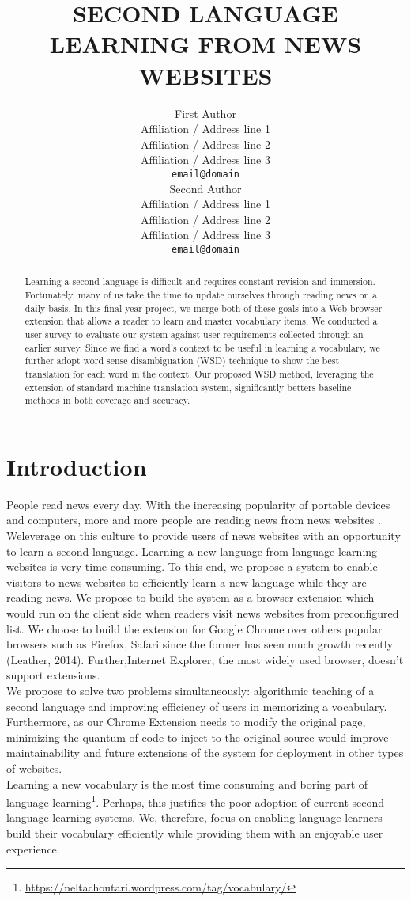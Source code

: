 \documentclass[11pt]{article}
\title{SECOND LANGUAGE LEARNING FROM NEWS WEBSITES}
\author{First Author \\
  Affiliation / Address line 1 \\
  Affiliation / Address line 2 \\
  Affiliation / Address line 3 \\
  {\tt email@domain} \\\And
  Second Author \\
  Affiliation / Address line 1 \\
  Affiliation / Address line 2 \\
  Affiliation / Address line 3 \\
  {\tt email@domain} \\}
\date{}
\begin{document}
\maketitle
\begin{abstract}
Learning a second language is difficult and requires
constant revision and immersion.  Fortunately, many of us take the
time to update ourselves through reading news on a daily basis.  
In this final year project, we merge both of these goals into a Web browser extension that allows a reader to learn and master vocabulary items. 
We conducted a user survey to evaluate our system against user requirements collected through an earlier survey. Since we find a word's context to be useful in learning a vocabulary, we further adopt word sense disambiguation (WSD)
technique to show the best translation for each word in the context.
Our proposed WSD method, leveraging the extension of standard machine translation system, significantly betters  baseline methods in both coverage and accuracy.
\end{abstract}


\section{Introduction}
People read news every day. With the increasing popularity of 
portable devices and computers, more and more people are reading 
news from news websites \cite{yarlh2012}.
\\
Weleverage on this culture to provide users of news websites 
with an opportunity to learn a second language.
Learning a new language from language learning websites is very time consuming. 
To this end, we propose a system to enable visitors to news websites to 
efficiently learn a new language while they are reading news. We propose to 
build the system as a browser extension which would run on the client side 
when readers visit news websites from preconfigured list.
We choose to build the extension for Google Chrome over others popular browsers 
such as Firefox, Safari since the former has seen much growth recently (Leather, 2014). 
Further,Internet Explorer, the most widely used browser, doesn't support extensions.
\\
We propose to solve two problems simultaneously: algorithmic  
teaching of a second language and improving efficiency of users in 
memorizing a vocabulary.
Furthermore, as our Chrome Extension needs to modify the original page, 
minimizing the quantum of code to inject to the original source would 
improve maintainability and future extensions of the system 
for deployment in other types of websites.
\\
Learning a new vocabulary is the most time consuming and boring part of 
language learning\footnote{\url{https://neltachoutari.wordpress.com/tag/vocabulary/}}. Perhaps, this justifies the 
poor adoption of current second language learning systems. We, therefore, 
focus on enabling language learners build their vocabulary efficiently while 
providing them with an enjoyable user experience.
\end{document}

